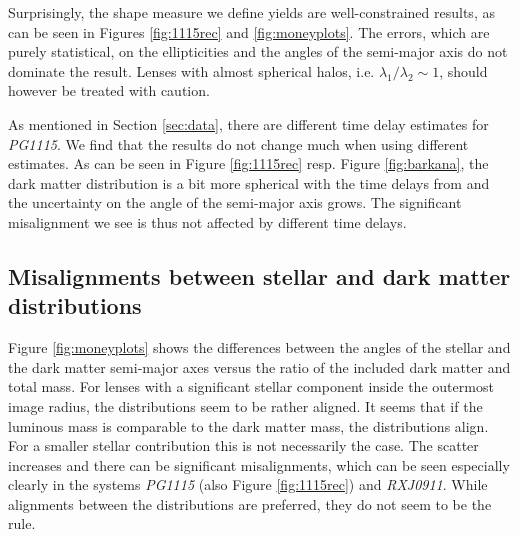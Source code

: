 \documentclass[useAMS,usenatbib]{mn2e}
\begin{document}
Surprisingly, the shape measure we define yields are well-constrained results, as can be seen in Figures \ref{fig:1115rec} and \ref{fig:moneyplots}. The errors, which are purely statistical, on the ellipticities and the angles of the semi-major axis do not dominate the result. Lenses with almost spherical halos, i.e. $\lambda_{1}/\lambda_{2}\sim1$, should however be treated with caution.

As mentioned in Section \ref{sec:data}, there are different time delay estimates for \textit{PG1115}. We find that the results do not change much when using different estimates. As can be seen in Figure \ref{fig:1115rec} resp. Figure \ref{fig:barkana}, the dark matter distribution is a bit more spherical with the time delays from \cite{2010MNRAS.406.2764T} and the uncertainty on the angle of the semi-major axis grows. The significant misalignment we see is thus not affected by different time delays.



\subsection{Misalignments between stellar and dark matter distributions}
Figure \ref{fig:moneyplots} shows the differences between the angles of the stellar and the dark matter semi-major axes versus the ratio of the included dark matter and total mass. For lenses with a significant stellar component inside the outermost image radius, the distributions seem to be rather aligned. It seems that if the luminous mass is comparable to the dark matter mass, the distributions align. For a smaller stellar contribution this is not necessarily the case. The scatter increases and there can be significant misalignments, which can be seen especially clearly in the systems \textit{PG1115} (also Figure \ref{fig:1115rec}) and \textit{RXJ0911}. While alignments between the distributions are preferred, they do not seem to be the rule.
\end{document}
